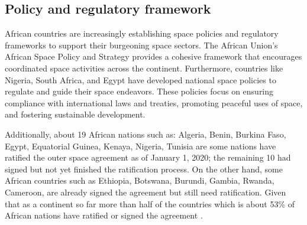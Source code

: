 \documentclass[final,5p,times, twocolumn, sort&compress, sc]{elsarticle}
\begin{document}
\subsection{\textbf{Policy and regulatory framework}}
	African countries are increasingly establishing space policies and regulatory frameworks to support their burgeoning space sectors. The African Union's African Space Policy and Strategy provides a cohesive framework that encourages coordinated space activities across the continent. Furthermore, countries like Nigeria, South Africa, and Egypt have developed national space policies to regulate and guide their space endeavors. These policies focus on ensuring compliance with international laws and treaties, promoting peaceful uses of space, and fostering sustainable development. 
	
	Additionally, about 19 African nations such as: Algeria, Benin, Burkina Faso, Egypt, Equatorial Guinea, Kenaya, Nigeria, Tunisia are some nations have ratified the outer space agreement as of January 1, 2020; the remaining 10 had signed but not yet finished the ratification process.  On the other hand, some African countries such as Ethiopia, Botswana, Burundi, Gambia, Rwanda, Cameroon, are already signed the agreement but still need ratification. Given that as a continent so far more than half of the countries which is about 53\% of African nations have ratified or signed the agreement \cite{at2023}.
	
	
\end{document}
